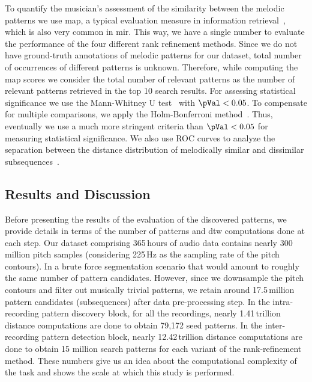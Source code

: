To quantify the musician's assessment of the similarity between the melodic patterns  we use \gls{map}, a typical evaluation measure in information retrieval~\citep{manning2008introduction}, which is also very common in \gls{mir}. This way, we have a single number to evaluate the performance of the four different rank refinement methods. Since we do not have ground-truth annotations of melodic patterns for our dataset, total number of occurrences of different patterns is unknown. Therefore, while computing the \gls{map} scores we consider the total number of relevant patterns as the number of relevant patterns retrieved in the top 10 search results.  For assessing statistical significance we use the Mann-Whitney U test~\citep{mann1947test} with $\pVal < 0.05$. To compensate for multiple comparisons, we apply the Holm-Bonferroni method~\citep{holm1979simple}. Thus, eventually we use a much more stringent criteria than $\pVal < 0.05$ for measuring statistical significance. We also use ROC curves to analyze the separation between the distance distribution of melodically similar and dissimilar subsequences~\citep{manning2008introduction}. 


\subsection{Results and Discussion}
\label{sec:patterns_discovery_results}

Before presenting the results of the evaluation of the discovered patterns, we provide details in terms of the number of patterns and \gls{dtw} computations done at each step. Our dataset comprising 365\,hours of audio data contains nearly 300\,million pitch samples (considering 225\,Hz as the sampling rate of the pitch contours). In a brute force segmentation scenario that would amount to roughly the same number of pattern candidates. However, since we downsample the pitch contours and filter out musically trivial patterns, we retain around 17.5\,million pattern candidates (subsequences) after data pre-processing step. In the intra-recording pattern discovery block, for all the recordings, nearly 1.41\,trillion distance computations are done to obtain 79,172 seed patterns. In the inter-recording pattern detection block, nearly 12.42\,trillion distance computations are done to obtain 15 million search patterns for each variant of the rank-refinement method. These numbers give us an idea about the computational complexity of the task and shows the scale at which this study is performed.

